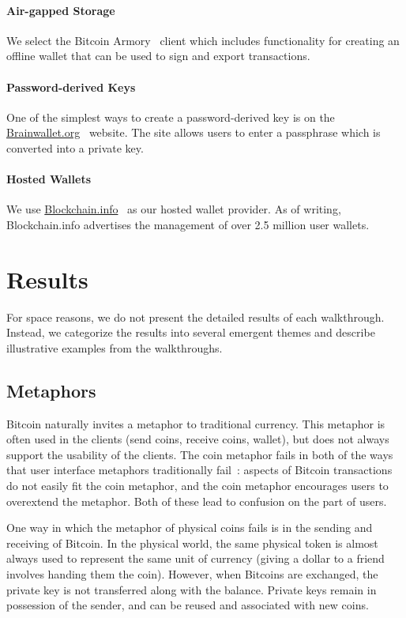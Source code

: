 \paragraph{Air-gapped Storage} We select the Bitcoin Armory~\cite{bitcoinarmory} client which includes functionality for creating an offline wallet that can be used to sign and export transactions. 

\paragraph{Password-derived Keys} One of the simplest ways to create a password-derived key is on the \url{Brainwallet.org}~\cite{brainwallet} website. The site allows users to enter a passphrase which is converted into a private key. 

\paragraph{Hosted Wallets} We use \url{Blockchain.info}~\cite{blockchain} as our hosted wallet provider. As of writing, Blockchain.info advertises the management of over 2.5 million user wallets.


\section{Results}
For space reasons, we do not present the detailed results of each walkthrough. Instead, we categorize the results into several emergent themes and describe illustrative examples from the walkthroughs. 

\subsection{Metaphors}
Bitcoin naturally invites a metaphor to traditional currency. This metaphor is often used in the clients (\eg send coins, receive coins, wallet), but does not always support the usability of the clients. The coin metaphor fails in both of the ways that user interface metaphors traditionally fail~\cite{metaphorpaper}: aspects of Bitcoin transactions do not easily fit the coin metaphor, and the coin metaphor encourages users to overextend the metaphor. Both of these lead to confusion on the part of users.  

One way in which the metaphor of physical coins fails is in the sending and receiving of Bitcoin. In the physical world, the same physical token is almost always used to represent the same unit of currency (\ie giving a dollar to a friend involves handing them the coin). However, when Bitcoins are exchanged, the private key is not transferred along with the balance. Private keys remain in possession of the sender, and can be reused and associated with new coins. 

